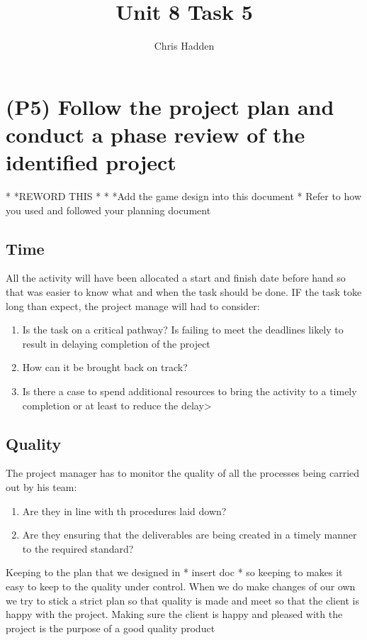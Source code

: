 \documentclass{article}
\begin{document}
\title{Unit 8 Task 5}
\author{Chris Hadden}
\date{}
\maketitle

\section{(P5) Follow the project plan and conduct a phase review of the identified project}
*
*REWORD THIS
*
*
*Add the game design into this document
*
Refer to how you used and followed your planning document
\subsection{Time}
All the activity will have been allocated a start and finish date before hand so that was easier to know what and when the task should be done. IF the task toke long than expect, the project manage will had to consider:
\begin{enumerate}
	\item Is  the task on a critical pathway? Is failing to meet the deadlines likely to result in delaying completion of the project
	\item How can it be brought back on track?
	\item Is there a case to spend additional resources to bring the activity to a timely completion or at least to reduce the delay>
\end{enumerate}

\subsection{Quality}
 The project manager has to monitor the quality of all the processes being carried out by his team:
 \begin{enumerate}
 	\item Are they in line with th procedures laid down?
	\item Are they ensuring that the deliverables are being created in a timely manner to the required standard?
\end{enumerate}

Keeping to the plan that we designed in * insert doc * so keeping to makes it easy to keep to the quality under control. When we do make changes of our own we try to stick a strict plan so that quality is made and meet so that the client is happy with the project. Making sure the client is happy and pleased with the project is the purpose of a good quality product 
\end{document}

